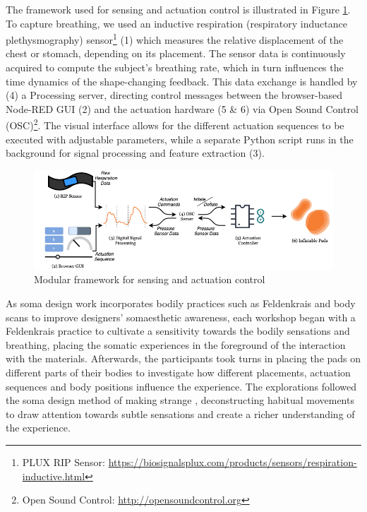 The framework used for sensing and actuation control is illustrated in Figure \ref{fig:workflow}.
To capture breathing, we used an inductive respiration (respiratory inductance plethysmography) sensor\footnote{PLUX RIP Sensor: \url{https://biosignalsplux.com/products/sensors/respiration-inductive.html}} (1) which measures the relative displacement of the chest or stomach, depending on its placement. The sensor data is continuously acquired to compute the subject's breathing rate, which in turn influences the time dynamics of the shape-changing feedback. This data exchange is handled by (4) a Processing server, directing control messages between the browser-based Node-RED GUI (2) and the actuation hardware (5 \& 6) via Open Sound Control (OSC)\footnote{Open Sound Control:  \url{http://opensoundcontrol.org}}. The visual interface allows for the different actuation sequences to be executed with adjustable parameters, while a separate Python script runs in the background for signal processing and feature extraction (3). 

\begin{figure}[t]
    \centering  
    \includegraphics[width=1.0\linewidth]{Chapters/Figures/soma_chi/fig_2_framework.png}
    \caption{Modular framework for sensing and actuation control}
    \label{fig:workflow}
\end{figure}

 As soma design work incorporates bodily practices such as Feldenkrais and body scans to improve designers’ somaesthetic awareness, each workshop began with a Feldenkrais practice to cultivate a sensitivity towards the bodily sensations and breathing, placing the somatic experiences in the foreground of the interaction with the materials. Afterwards, the participants took turns in placing the pads on different parts of their bodies to investigate how different placements, actuation sequences and body positions influence the experience. The explorations followed the soma design method of making strange \cite{loke_moving_2013}, deconstructing habitual movements to draw attention towards subtle sensations and create a richer understanding of the experience.

